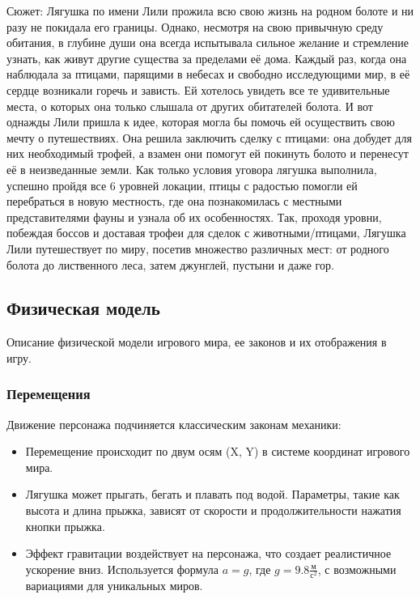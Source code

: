 \documentclass{article}
\begin{document}
Сюжет: Лягушка по имени Лили прожила всю свою жизнь на родном болоте и ни разу не покидала его границы. Однако, несмотря на свою привычную среду обитания, в глубине души она всегда испытывала сильное желание и стремление узнать, как живут другие существа за пределами её дома. Каждый раз, когда она наблюдала за птицами, парящими в небесах и свободно исследующими мир, в её сердце возникали горечь и зависть. Ей хотелось увидеть все те удивительные места, о которых она только слышала от других обитателей болота. И вот однажды Лили пришла к идее, которая могла бы помочь ей осуществить свою мечту о путешествиях. Она решила заключить сделку с птицами: она добудет для них необходимый трофей, а взамен они помогут ей покинуть болото и перенесут её в неизведанные земли. Как только условия уговора лягушка выполнила, успешно пройдя все 6 уровней локации, птицы с радостью помогли ей перебраться в новую местность, где она познакомилась с местными представителями фауны и узнала об их особенностях. Так, проходя уровни, побеждая боссов и доставая трофеи для сделок с животными/птицами, Лягушка Лили путешествует по миру, посетив множество различных мест: от родного болота до лиственного леса, затем джунглей, пустыни и даже гор.

\subsection{Физическая модель}
Описание физической модели игрового мира, ее законов и их отображения в игру. 

\subsubsection{Перемещения}
Движение персонажа подчиняется классическим законам механики: 
\begin{itemize}
    \item Перемещение происходит по двум осям (X, Y) в системе координат игрового мира.
    \item Лягушка может прыгать, бегать и плавать под водой. Параметры, такие как высота и длина прыжка, зависят от скорости и продолжительности нажатия кнопки прыжка.
    \item Эффект гравитации воздействует на персонажа, что создает реалистичное ускорение вниз. Используется формула $a = g$, где $g = 9.8 \frac{м}{с^2}$, с возможными вариациями для уникальных миров.
\end{itemize}
\end{document}
